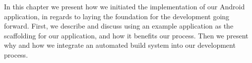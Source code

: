 In this chapter we present how we initiated the implementation of our Android application, in regards to laying the foundation for the development going forward.
First, we describe and discuss using an example application as the scaffolding for our application, and how it benefits our process.
Then we present why and how we integrate an automated build system into our development process.

